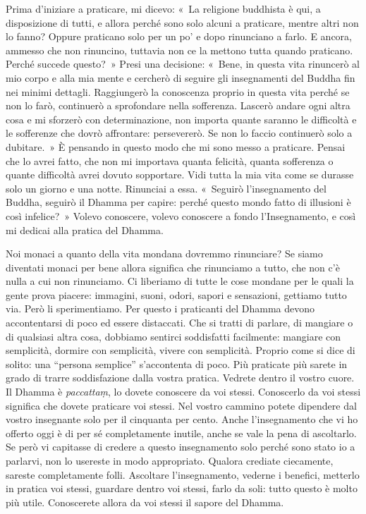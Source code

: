 Prima d'iniziare a praticare, mi dicevo: «~La religione buddhista è qui,
a disposizione di tutti, e allora perché sono solo alcuni a praticare,
mentre altri non lo fanno? Oppure praticano solo per un po' e dopo
rinunciano a farlo. E ancora, ammesso che non rinuncino, tuttavia non ce
la mettono tutta quando praticano. Perché succede questo?~» Presi una
decisione: «~Bene, in questa vita rinuncerò al mio corpo e alla mia
mente e cercherò di seguire gli insegnamenti del Buddha fin nei minimi
dettagli. Raggiungerò la conoscenza proprio in questa vita perché se non
lo farò, continuerò a sprofondare nella sofferenza. Lascerò andare ogni
altra cosa e mi sforzerò con determinazione, non importa quante saranno
le difficoltà e le sofferenze che dovrò affrontare: persevererò. Se non
lo faccio continuerò solo a dubitare.~» È pensando in questo modo che mi
sono messo a praticare. Pensai che lo avrei fatto, che non mi importava
quanta felicità, quanta sofferenza o quante difficoltà avrei dovuto
sopportare. Vidi tutta la mia vita come se durasse solo un giorno e una
notte. Rinunciai a essa. «~Seguirò l'insegnamento del Buddha, seguirò il
Dhamma per capire: perché questo mondo fatto di illusioni è così
infelice?~» Volevo conoscere, volevo conoscere a fondo l'Insegnamento, e
così mi dedicai alla pratica del Dhamma.

Noi monaci a quanto della vita mondana dovremmo rinunciare? Se siamo
diventati monaci per bene allora significa che rinunciamo a tutto, che
non c'è nulla a cui non rinunciamo. Ci liberiamo di tutte le cose
mondane per le quali la gente prova piacere: immagini, suoni, odori,
sapori e sensazioni, gettiamo tutto via. Però li sperimentiamo. Per
questo i praticanti del Dhamma devono accontentarsi di poco ed essere
distaccati. Che si tratti di parlare, di mangiare o di qualsiasi altra
cosa, dobbiamo sentirci soddisfatti facilmente: mangiare con semplicità,
dormire con semplicità, vivere con semplicità. Proprio come si dice di
solito: una ``persona semplice'' s'accontenta di poco. Più praticate più
sarete in grado di trarre soddisfazione dalla vostra pratica. Vedrete
dentro il vostro cuore. Il Dhamma è \emph{paccattaṃ}, lo dovete
conoscere da voi stessi. Conoscerlo da voi stessi significa che dovete
praticare voi stessi. Nel vostro cammino potete dipendere dal vostro
insegnante solo per il cinquanta per cento. Anche l'insegnamento che vi
ho offerto oggi è di per sé completamente inutile, anche se vale la pena
di ascoltarlo. Se però vi capitasse di credere a questo insegnamento
solo perché sono stato io a parlarvi, non lo usereste in modo
appropriato. Qualora crediate ciecamente, sareste completamente folli.
Ascoltare l'insegnamento, vederne i benefici, metterlo in pratica voi
stessi, guardare dentro voi stessi, farlo da soli: tutto questo è molto
più utile. Conoscerete allora da voi stessi il sapore del Dhamma.

